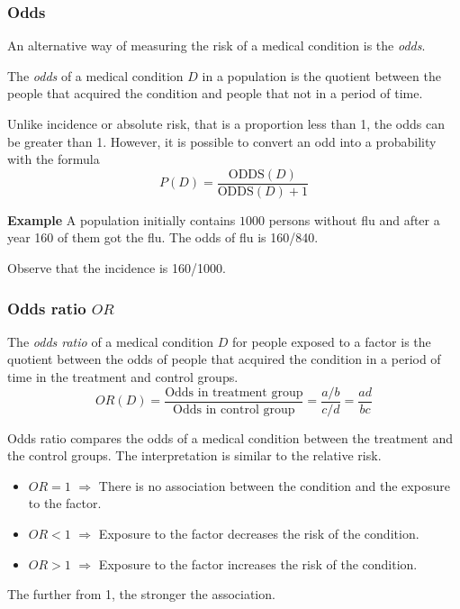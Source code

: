 \begin{frame}
\frametitle{Odds}
An alternative way of measuring the risk of a medical condition is the \emph{odds}.

\begin{definition}[Odds]
The \emph{odds} of a medical condition $D$ in a population is the quotient between the people that acquired the condition and people that not in a period of time. 
\end{definition}

Unlike incidence or absolute risk, that is a proportion less than 1, the odds can be greater than 1. 
However, it is possible to convert an odd into a probability with the formula
\[
  P(D) = \frac{\mbox{ODDS}(D)}{\mbox{ODDS}(D)+1}
\]

\textbf{Example} A population initially contains $1000$ persons without flu and after a year 160 of them got the flu. 
The odds of flu is 160/840.

Observe that the incidence is 160/1000. 
\end{frame}
 

\begin{frame}
\frametitle{Odds ratio $OR$}
\begin{definition}
The \emph{odds ratio} of a medical condition $D$ for people exposed to a factor is the quotient between the odds of people that acquired the condition in a period of time in the treatment and control groups.
\[
  OR(D)=\frac{\mbox{Odds in treatment group}}{\mbox{Odds in control group}}=\frac{a/b}{c/d}=\frac{ad}{bc}
\]
\end{definition}

Odds ratio compares the odds of a medical condition between the treatment and the control groups. 
The interpretation is similar to the relative risk. 
\begin{itemize}
  \item $OR=1$ $\Rightarrow$ There is no association between the condition and the exposure to the factor. 
  \item $OR<1$ $\Rightarrow$ Exposure to the factor decreases the risk of the condition.
  \item $OR>1$ $\Rightarrow$ Exposure to the factor increases the risk of the condition.
\end{itemize}
The further from 1, the stronger the association. 
\end{frame}


